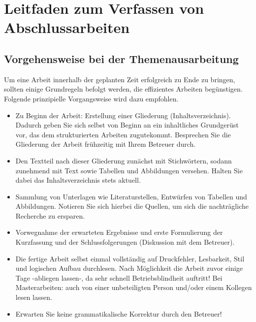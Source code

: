 %
%
%
%

\section{Leitfaden zum Verfassen von Abschlussarbeiten}

\subsection{Vorgehensweise bei der Themenausarbeitung}
\label{sec: vorgehensweise bei der themenausarbeitung}

Um eine Arbeit innerhalb der geplanten Zeit erfolgreich zu Ende zu bringen, sollten einige Grundregeln befolgt werden, die effizientes Arbeiten begünstigen. Folgende prinzipielle Vorgangsweise wird dazu empfohlen.

\begin{itemize}
    \item Zu Beginn der Arbeit: Erstellung einer Gliederung (Inhaltsverzeichnis). Dadurch geben Sie sich selbst von Beginn an ein inhaltliches Grundgerüst vor, das dem strukturierten Arbeiten zugutekommt. Besprechen Sie die Gliederung der Arbeit frühzeitig mit Ihrem Betreuer durch.
    \item Den Textteil nach dieser Gliederung zunächst mit Stichwörtern, sodann zunehmend mit Text sowie Tabellen und Abbildungen versehen. Halten Sie dabei das Inhaltsverzeichnis stets aktuell.
    \item Sammlung von Unterlagen wie Literaturstellen, Entwürfen von Tabellen und Abbildungen. Notieren Sie sich hierbei die Quellen, um sich die nachträgliche Recherche zu ersparen. 
    \item Vorwegnahme der erwarteten Ergebnisse und erste Formulierung der Kurzfassung und der Schlussfolgerungen (Diskussion mit dem Betreuer).
    \item Die fertige Arbeit selbst einmal vollständig auf Druckfehler, Lesbarkeit, Stil und logischen Aufbau durchlesen. Nach Möglichkeit die Arbeit zuvor einige Tage -abliegen lassen-, da sehr schnell Betriebsblindheit auftritt! Bei Masterarbeiten: auch von einer unbeteiligten Person und/oder einem Kollegen lesen lassen.
    \item Erwarten Sie keine grammatikalische Korrektur durch den Betreuer!
\end{itemize}

